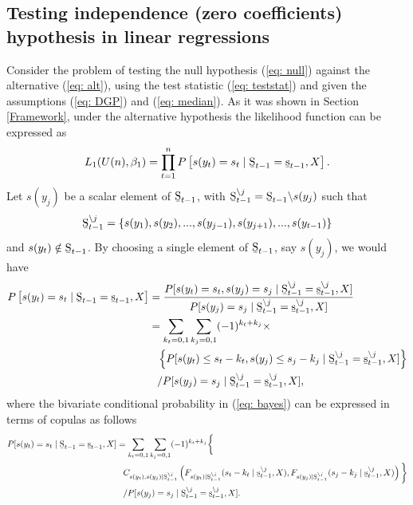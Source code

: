 \documentclass[harvard,11pt]{article}
\begin{document}
\subsection[Testing independence (zero coefficients) hypothesis in linear regressions ]{Testing independence (zero coefficients) hypothesis in linear reg\-ressions \label{Linear}}
Consider the problem of testing the null hypothesis (\ref{eq: null}) against the alternative (\ref{eq: alt}), using the test statistic (\ref{eq: teststat}) and given the assumptions (\ref{eq: DGP}) and (\ref{eq: median}). As it was shown in Section \ref{Framework}, under the alternative hypothesis the likelihood function can be expressed as
\begin{equation}\label{eq: likelihood1}
L_1(U(n),\beta_1)=\prod\limits_{t=1}^{n}P\left[s(y_t)=s_t\mid \text{\b{S}}_{t-1}=\text{\b{s}}_{t-1},X\right].
\end{equation}
Let $s(y_j)$ be a scalar element of $\text{\b{S}}_{t-1}$, with $\text{\b{S}}_{t-1}^{\backslash j}=\text{\b{S}}_{t-1}\backslash s(y_j)$ such that
\[
 \text{\b{S}}_{t-1}^{\backslash j}=\left\{s(y_1),s(y_2),...,s(y_{j-1}),s(y_{j+1}),...,s(y_{t-1})\right\}
\] 
and $s(y_t)\notin \text{\b{S}}_{t-1}$. By choosing a single element of $\text{\b{S}}_{t-1}$, say $s(y_j)$, we would have
\begingroup
\allowdisplaybreaks
\begin{align}\label{eq: bayes}
\begin{split}
P\left[s(y_t)=s_t\mid\text{\b{S}}_{t-1}=\text{\b{s}}_{t-1},X\right]&=\frac{P[s(y_t)=s_t,s(y_j)=s_j\mid\text{\b{S}}_{t-1}^{\backslash j}=\text{\b{s}}_{t-1}^{\backslash j},X]}{P[s(y_j)=s_j\mid\text{\b{S}}_{t-1}^{\backslash j}=\text{\b{s}}_{t-1}^{\backslash j},X]}\\
&=\sum\limits_{k_t=0,1}\sum\limits_{k_j=0,1}(-1)^{k_t+k_j}\times\\
&\textcolor{white}{=}\left\{P[s(y_t)\leq s_t-k_t,s(y_j)\leq s_j-k_j\mid \text{\b{S}}_{t-1}^{\backslash j}=\text{\b{s}}_{t-1}^{\backslash j},X]\right\}\\
&\textcolor{white}{=}/P[s(y_j)=s_j\mid \text{\b{S}}_{t-1}^{\backslash j}=\text{\b{s}}_{t-1}^{\backslash j},X],
\end{split}
\end{align}
\endgroup
where the bivariate conditional probability in (\ref{eq: bayes}) can be expressed in terms of copulas as follows
\begingroup
\allowdisplaybreaks
\begin{align}\label{eq: copulas}
\begin{split}
P[s(y_t)=s_t\mid \text{\b{S}}_{t-1}=\text{\b{s}}_{t-1},X]&=\sum\limits_{k_t=0,1}\sum\limits_{k_j=0,1}(-1)^{k_t+k_j}\bigg\{\\
&\textcolor{white}{=}C_{s(y_t),s(y_j)\mid \text{\b{S}}_{t-1}^{\backslash j} }\left(F_{s(y_t)\mid\text{\b{S}}_{t-1}^{\backslash j}}(s_t-k_t\mid\text{\b{s}}_{t-1}^{\backslash j},X),F_{s(y_j)\mid\text{\b{S}}_{t-1}^{\backslash j}}(s_j-k_j\mid \text{\b{s}}_{t-1}^{\backslash j},X)\right)\bigg\}\\
&\textcolor{white}{=}/P[s(y_j)=s_j\mid \text{\b{S}}_{t-1}^{\backslash j}=\text{\b{s}}_{t-1}^{\backslash j},X].
\end{split}
\end{align}
\end{document}
